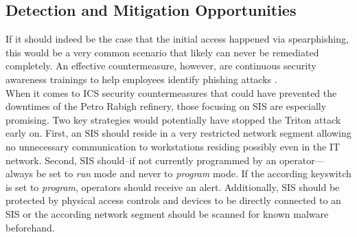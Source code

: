 \documentclass[runningheads]{llncs}
\begin{document}
\subsection{Detection and Mitigation Opportunities}
\label{subsection:triton-detection-mitigation}
If it should indeed be the case that the initial access happened via spearphishing, this would be a very common scenario that likely can never be remediated completely.
An effective countermeasure, however, are continuous security awareness trainings to help employees identify phishing attacks \cite{arachchilage.14}.\\
When it comes to ICS security countermeasures that could have prevented the downtimes of the Petro Rabigh refinery, those focusing on SIS are especially promising.
Two key strategies would potentially have stopped the Triton attack early on.
First, an SIS should reside in a very restricted network segment allowing no unnecessary communication to workstations residing possibly even in the IT network.
Second, SIS should--if not currently programmed by an operator---always be set to \textit{run} mode and never to \textit{program} mode.
If the according keyswitch is set to \textit{program}, operators should receive an alert.
Additionally, SIS should be protected by physical access controls and devices to be directly connected to an SIS or the according network segment should be scanned for known malware beforehand. \cite{dragos.17}
\end{document}
